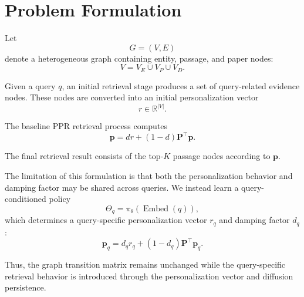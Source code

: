 \documentclass[conference]{IEEEtran}
\newcommand{\q}{q}
\newcommand{\reset}{r}
\newcommand{\policy}{\pi_{\theta}}
\begin{document}
\section{Problem Formulation}

Let
\begin{equation}
G=(V,E)
\end{equation}
denote a heterogeneous graph containing entity, passage, and paper
nodes:
\begin{equation}
V=V_E\cup V_P\cup V_D.
\end{equation}

Given a query $\q$, an initial retrieval stage produces a set of
query-related evidence nodes. These nodes are converted into an
initial personalization vector
\begin{equation}
\reset\in\mathbb{R}^{|V|}.
\end{equation}

The baseline PPR retrieval process computes
\begin{equation}
\mathbf{p}
=
d\reset+(1-d)\mathbf{P}^{\top}\mathbf{p}.
\end{equation}

The final retrieval result consists of the top-$K$ passage nodes
according to $\mathbf{p}$.

The limitation of this formulation is that both the personalization
behavior and damping factor may be shared across queries. We instead
learn a query-conditioned policy
\begin{equation}
\Theta_{\q}
=
\policy(\operatorname{Embed}(\q)),
\label{eq:policy}
\end{equation}
which determines a query-specific personalization vector
$\reset_{\q}$ and damping factor $d_{\q}$:
\begin{equation}
\mathbf{p}_{\q}
=
d_{\q}\reset_{\q}
+
(1-d_{\q})\mathbf{P}^{\top}\mathbf{p}_{\q}.
\label{eq:adaptive-ppr}
\end{equation}

Thus, the graph transition matrix remains unchanged while the
query-specific retrieval behavior is introduced through the
personalization vector and diffusion persistence.
\end{document}
